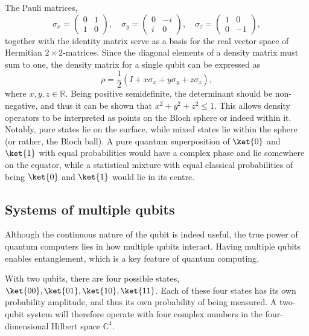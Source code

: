 The Pauli matrices,
\begin{equation}
  \sigma_x = \begin{pmatrix} 0 & 1 \\ 1 & 0 \end{pmatrix}, \quad
  \sigma_y = \begin{pmatrix} 0 & -i \\ i & 0 \end{pmatrix}, \quad
  \sigma_z = \begin{pmatrix} 1 & 0 \\ 0 & -1 \end{pmatrix},
  \label{eq:pauli}
\end{equation}
together with the identity matrix serve as a basis for the real vector space of Hermitian $2\times 2$-matrices.
Since the diagonal elements of a density matrix must sum to one, the density matrix for a single qubit can be expressed as
\begin{equation}
  \rho = \frac{1}{2} \left(I + x \sigma_x + y \sigma_y + z \sigma_z\right),
\end{equation}
where $x, y, z \in \mathbb{R}$.
Being positive semidefinite, the determinant should be non-negative, and thus it can be shown that $x^2 + y^2 + z^2 \leq 1$.
This allows density operators to be interpreted as points on the Bloch sphere or indeed within it.
Notably, pure states lie on the surface, while mixed states lie within the sphere (or rather, the Bloch ball).
A pure quantum superposition of $\ket{0}$ and $\ket{1}$ with equal probabilities would have a complex phase and lie somewhere on the equator, while a statistical mixture with equal classical probabilities of being $\ket{0}$ and $\ket{1}$ would lie in its centre.

\subsection{Systems of multiple qubits}
Although the continuous nature of the qubit is indeed useful, the true power of quantum computers lies in how multiple qubits interact.
Having multiple qubits enables entanglement, which is a key feature of quantum computing.

With two qubits, there are four possible states, $\ket{00}, \ket{01}, \ket{10}, \ket{11}$.
Each of these four states has its own probability amplitude, and thus its own probability of being measured.
A two-qubit system will therefore operate with four complex numbers in the four-dimensional Hilbert space $\mathbb{C}^{4}$.

